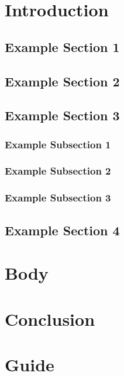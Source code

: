 \documentclass{report}
\begin{document}
	
	
	
	
	
	
	
	


	\chapter{Introduction}


	\section{Example Section 1}
	\blindtext[2]
	\blindtext[2]
	\section{Example Section 2}
	\blindtext[5]
	\section{Example Section 3}
	\subsection{Example Subsection 1}
	\blindtext[5]
	\subsection{Example Subsection 2}
	\blindtext[5]
	\subsection{Example Subsection 3}
	\blindtext[5]
	\section{Example Section 4}
	\blindtext[5]
	\chapter{Body}
	\blindtext[20]
	\chapter{Conclusion}
	\blindtext[10]

	\chapter{Guide}
	


	
	\printbibliography
\end{document}
